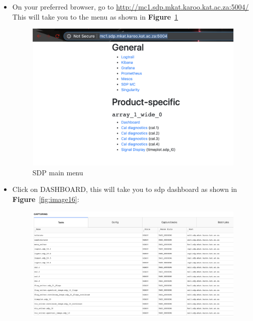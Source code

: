 \begin{itemize}
\item[\textbf{Step 1}] On your preferred browser, go to \url{http://mc1.sdp.mkat.karoo.kat.ac.za:5004/}\\
This will take you to the menu as shown in \textbf{Figure}~\ref{fig:image96}
\begin{figure}[!thb]
	\centering
	\includegraphics[scale=0.33]{Chapters/images/image96.png}
	
	\caption{SDP main menu}
	\label{fig:image96}
\end{figure}


\item[\textbf{Step 2}] Click on DASHBOARD,  this will take you to sdp dashboard as shown in \textbf{Figure}~\ref{fig:image16}:


\begin{figure}[!thb]
	\centering
	\includegraphics[scale=0.19]{Chapters/images/image16.png}
	

\end{figure}
\end{itemize}
